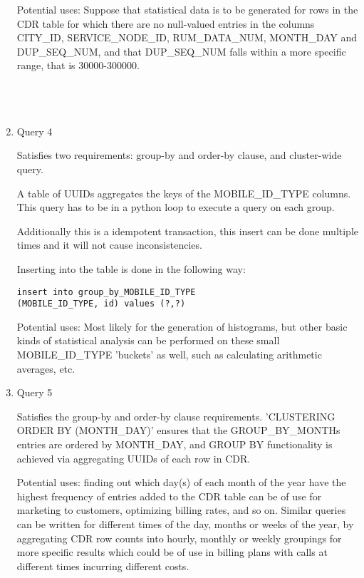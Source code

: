 \documentclass[letterpaper]{article}
\begin{document}
\begin{enumerate}
		Potential uses: Suppose that statistical data is to be generated for rows in the
		CDR table for which there are no null-valued entries in the columns CITY\_ID,
		SERVICE\_NODE\_ID, RUM\_DATA\_NUM, MONTH\_DAY and DUP\_SEQ\_NUM, and that DUP\_SEQ\_NUM
		falls within a more specific range, that is 30000-300000.
		\\\\\\\\
	\item Query 4
		

		Satisfies two requirements: group-by and order-by clause, and cluster-wide query.

		A table of UUIDs aggregates the keys of the MOBILE\_ID\_TYPE columns.
		This query has to be in a python loop to execute a query on each group.
		

		Additionally this is a idempotent transaction, this insert can be done multiple times and it 	
		will not cause inconsistencies.

		Inserting into the table is done in the following way:
		\begin{lstlisting}[frame=single]
insert into group_by_MOBILE_ID_TYPE 
(MOBILE_ID_TYPE, id) values (?,?)
		\end{lstlisting}
		
		Potential uses: Most likely for the generation of histograms, but other basic
		kinds of statistical analysis can be performed on these small MOBILE\_ID\_TYPE 
		'buckets' as well, such as calculating arithmetic averages, etc.

	\item Query 5
		

		Satisfies the group-by and order-by clause requirements. 
		'CLUSTERING ORDER BY (MONTH\_DAY)' ensures that the GROUP\_BY\_MONTHs entries are ordered
		by MONTH\_DAY, and GROUP BY functionality is achieved via aggregating UUIDs of each 
		row in CDR.
		
		Potential uses: finding out which day(s) of each month of the year have the highest
		frequency of entries added to the CDR table can be of use for marketing to customers,
		optimizing billing rates, and so on. Similar queries can be written for different
		times of the day, months or weeks of the year, by aggregating CDR row counts into 
		hourly, monthly or weekly groupings for more specific results which could be of use 
		in billing plans with calls at different times incurring different costs.
\end{enumerate}
\end{document}
